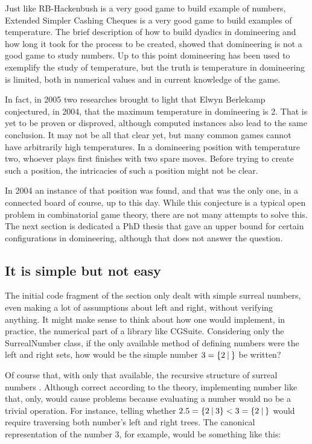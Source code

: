 Just like RB-Hackenbush is a very good game to build example of numbers, Extended Simpler Cashing Cheques is a very good game to build examples of temperature. The brief description of how to build dyadics in domineering and how long it took for the process to be created, showed that domineering is not a good game to study numbers. Up to this point domineering has been used to exemplify the study of temperature, but the truth is temperature in domineering is limited, both in numerical values and in current knowledge of the game.

In fact, in 2005 two researches brought to light that Elwyn Berlekamp conjectured, in 2004, that the maximum temperature in domineering is 2. That is yet to be proven or disproved, although computed instances also lead to the same conclusion. It may not be all that clear yet, but many common games cannot have arbitrarily high temperatures. In a domineering position with temperature two, whoever plays first finishes with two spare moves. Before trying to create such a position, the intricacies of such a position might not be clear.

In 2004 an instance of that position was found, and that was the only one, in a connected board of course, up to this day. While this conjecture is a typical open problem in combinatorial game theory, there are not many attempts to solve this. The next section is dedicated a PhD thesis that gave an upper bound for certain configurations in domineering, although that does not answer the question.

\subsection*{It is simple but not easy}

The initial code fragment of the section only dealt with simple surreal numbers, even making a lot of assumptions about left and right, without verifying anything. It might make sense to think about how one would implement, in practice, the numerical part of a library like CGSuite. Considering only the SurrealNumber class, if the only available method of defining numbers were the left and right sets, how would be the simple number $3 = \mbox{$\{2\:|\:\}$}$ be written?

Of course that, with only that available, the recursive structure of surreal numbers \gam{\gam{\gam{\gam{}{}}{}}{}}{}. Although correct according to the theory, implementing number like that, only, would cause problems because evaluating a number would no be a trivial operation. For instance, telling whether $2.5 = \mbox{$\{2\:|\:3\}$} < 3 = \mbox{$\{2\:|\:\}$}$ would require traversing both number's left and right trees. The canonical representation of the number 3, for example, would be something like this:

